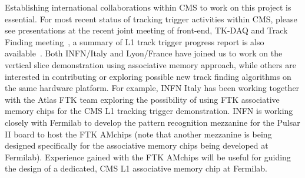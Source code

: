 

\noindent Establishing international collaborations within CMS to work on this project is essential. 
For most recent status of tracking trigger activities within CMS, please see presentations at the recent joint meeting of front-end, TK-DAQ and Track Finding meeting~\cite{bib:joint-meeting}, a summary of L1 track trigger progress report is also available~\cite{bib:summary}. Both INFN/Italy and Lyon/France have joined us to work on the vertical slice demonstration using associative memory approach, while others are interested in contributing or exploring possible new track finding algorithms on the same hardware platform. For example, INFN Italy has been working together with the Atlas FTK team exploring the possibility of using FTK associative memory chips for the CMS L1 tracking trigger demonstration. INFN is working closely with Fermilab to develop the pattern recognition mezzanine for the Pulsar II board to host the FTK AMchips (note that another mezzanine is being designed specifically for the associative memory chips being developed at Fermilab).  Experience gained with the FTK AMchips will be useful for guiding the design of a dedicated, CMS L1 associative memory chip at Fermilab. 

